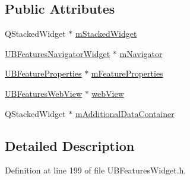 \subsection*{Public Attributes}
\begin{DoxyCompactItemize}
\item 
Q\-Stacked\-Widget $\ast$ \hyperlink{class_u_b_features_central_widget_ada7c605148002a7663c245e465480f80}{m\-Stacked\-Widget}
\item 
\hyperlink{class_u_b_features_navigator_widget}{U\-B\-Features\-Navigator\-Widget} $\ast$ \hyperlink{class_u_b_features_central_widget_a2acf43463b3d0d270fa72edc73f59d0f}{m\-Navigator}
\item 
\hyperlink{class_u_b_feature_properties}{U\-B\-Feature\-Properties} $\ast$ \hyperlink{class_u_b_features_central_widget_ac30b1892592bc9c4094d94cb45788412}{m\-Feature\-Properties}
\item 
\hyperlink{class_u_b_features_web_view}{U\-B\-Features\-Web\-View} $\ast$ \hyperlink{class_u_b_features_central_widget_a68e5fbe9c8c6fa56f1b0978ab88df5df}{web\-View}
\item 
Q\-Stacked\-Widget $\ast$ \hyperlink{class_u_b_features_central_widget_acf9e5e0db5d8f596115dc05aa9bd6179}{m\-Additional\-Data\-Container}
\end{DoxyCompactItemize}


\subsection{Detailed Description}


Definition at line 199 of file U\-B\-Features\-Widget.\-h.



